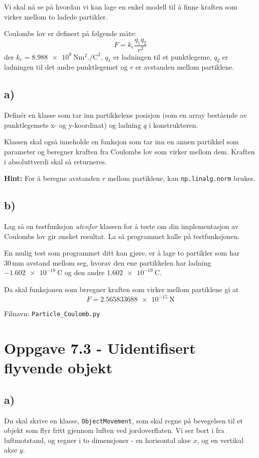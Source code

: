 \documentclass[10pt,a4paper]{article}
\begin{document}
Vi skal nå se på hvordan vi kan lage en enkel modell til å finne kraften som virker mellom to ladede partikler. 
 
Coulombs lov er definert på følgende måte:
\[
F = k_e\frac{q_1q_2}{r^2}
\]
der $k_e = \SI{8.988e9}{\newton\square\meter.\per\square\coulomb}$, $q_1$ er ladningen til et punktlegeme, $q_2$ er ladningen til det andre punktlegemet og $r$ er avstanden mellom partiklene.
 
\subsection*{a)}
Definér en klasse som tar inn partikkelens posisjon (som en array bestående av punktlegemets x- og y-koordinat) og ladning $q$ i konstruktøren. 
 
Klassen skal også inneholde en funksjon som tar inn en annen partikkel som parameter og beregner kraften fra Coulombs lov som virker mellom dem. Kraften i absoluttverdi skal så returneres. 
 
\textbf{Hint: } For å beregne avstanden $r$ mellom partiklene, kan \texttt{np.linalg.norm} brukes. 
\subsection*{b)}
Lag så en testfunksjon \textit{utenfor} klassen for å teste om din implementasjon av Coulombs lov gir ønsket resultat. La så programmet kalle på testfunksjonen. 
 
En mulig test som programmet ditt kan gjøre, er å lage to partikler som har $30 \,\si{\milli\meter}$ avstand mellom seg, hvorav den ene partikkelen har ladning $\SI{-1.602e-19}{\coulomb}$ og den andre $\SI{1.602e-19}{\coulomb}$. 
 
Da skal funksjonen som beregner kraften som virker mellom partiklene gi at 
\[
F = \SI{2.565833688e-15}{\newton}
\]
 
Filnavn: \texttt{Particle\_Coulomb.py}

\section*{Oppgave 7.3 - Uidentifisert flyvende objekt}
\subsection*{a)}
Du skal skrive en klasse, \texttt{ObjectMovement}, som skal regne på bevegelsen til et objekt som flyr fritt gjennom luften ved jordoverflaten. Vi ser bort i fra luftmotstand, og regner i to dimensjoner - en horisontal akse $x$, og en vertikal akse $y$.
 
\end{document}
